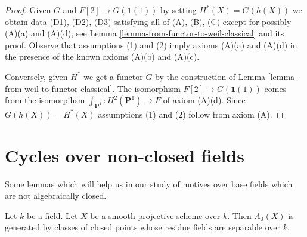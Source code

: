 \begin{proof}
Given $G$ and $F[2] \to G(\mathbf{1}(1))$ by setting $H^*(X) = G(h(X))$
we obtain data (D1), (D2), (D3) satisfying all of (A), (B), (C)
except for possibly (A)(a) and (A)(d), see
Lemma \ref{lemma-from-functor-to-weil-classical} and its proof.
Observe that assumptions (1) and (2) imply axioms (A)(a) and (A)(d)
in the presence of the known axioms (A)(b) and (A)(c).

\medskip\noindent
Conversely, given $H^*$ we get a functor $G$ by the construction of
Lemma \ref{lemma-from-weil-to-functor-classical}. The isomorphism
$F[2] \to G(\mathbf{1}(1))$ comes from the isomorpihsm
$\int_{\mathbf{P}^1} : H^2(\mathbf{P}^1) \to F$ of axiom (A)(d).
Since $G(h(X)) = H^*(X)$ assumptions (1) and (2) follow from axiom (A).
\end{proof}











\section{Cycles over non-closed fields}
\label{sections-cycles-nonclosed}

\noindent
Some lemmas which will help us in our study of motives
over base fields which are not algebraically closed.

\begin{lemma}
\label{lemma-generated-by-separable}
Let $k$ be a field. Let $X$ be a smooth projective scheme over $k$.
Then $A_0(X)$ is generated by classes of closed points whose residue
fields are separable over $k$.
\end{lemma}


